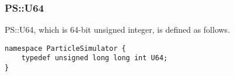 
\subsubsection{PS::U64}

PS::U64, which is 64-bit unsigned integer, is defined as follows.
\begin{lstlisting}[caption=U64]
namespace ParticleSimulator {
    typedef unsigned long long int U64;
}
\end{lstlisting}


